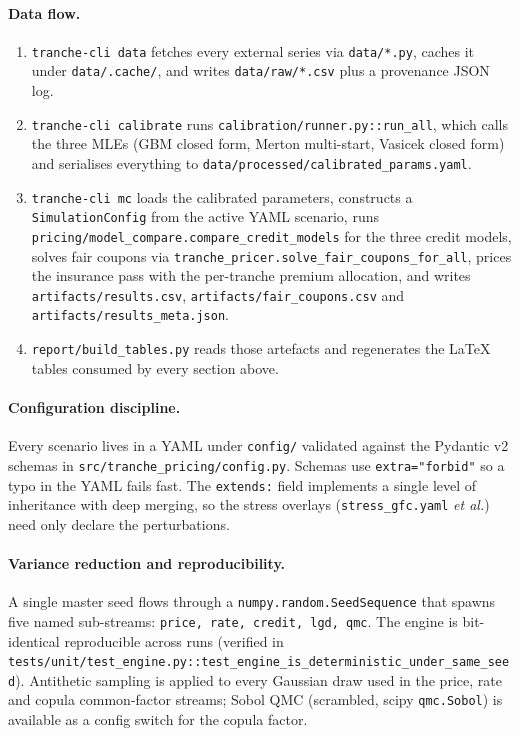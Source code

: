 \paragraph{Data flow.}
\begin{enumerate}
  \item \texttt{tranche-cli data} fetches every external series via
        \texttt{data/*.py}, caches it under \texttt{data/.cache/}, and
        writes \texttt{data/raw/*.csv} plus a provenance JSON log.
  \item \texttt{tranche-cli calibrate} runs
        \texttt{calibration/runner.py::run\_all}, which calls the three
        MLEs (GBM closed form, Merton multi-start, Vasicek closed form)
        and serialises everything to
        \texttt{data/processed/calibrated\_params.yaml}.
  \item \texttt{tranche-cli mc} loads the calibrated parameters,
        constructs a \texttt{SimulationConfig} from the active YAML
        scenario, runs \texttt{pricing/model\_compare.compare\_credit\_models}
        for the three credit models, solves fair coupons via
        \texttt{tranche\_pricer.solve\_fair\_coupons\_for\_all}, prices
        the insurance pass with the per-tranche premium allocation, and
        writes \texttt{artifacts/results.csv},
        \texttt{artifacts/fair\_coupons.csv} and
        \texttt{artifacts/results\_meta.json}.
  \item \texttt{report/build\_tables.py} reads those artefacts and
        regenerates the LaTeX tables consumed by every section above.
\end{enumerate}

\paragraph{Configuration discipline.}
Every scenario lives in a YAML under \texttt{config/} validated against
the Pydantic v2 schemas in \texttt{src/tranche\_pricing/config.py}.
Schemas use \texttt{extra="forbid"} so a typo in the YAML fails fast.
The \texttt{extends:} field implements a single level of inheritance with
deep merging, so the stress overlays (\texttt{stress\_gfc.yaml} \emph{et
al.}) need only declare the perturbations.

\paragraph{Variance reduction and reproducibility.}
A single master seed flows through a \texttt{numpy.random.SeedSequence}
that spawns five named sub-streams: \texttt{price, rate, credit, lgd,
qmc}. The engine is bit-identical reproducible across runs (verified in
\texttt{tests/unit/test\_engine.py::test\_engine\_is\_deterministic\_under\_same\_seed}).
Antithetic sampling is applied to every Gaussian draw used in the price,
rate and copula common-factor streams; Sobol QMC (scrambled, scipy
\texttt{qmc.Sobol}) is available as a config switch for the copula
factor.
